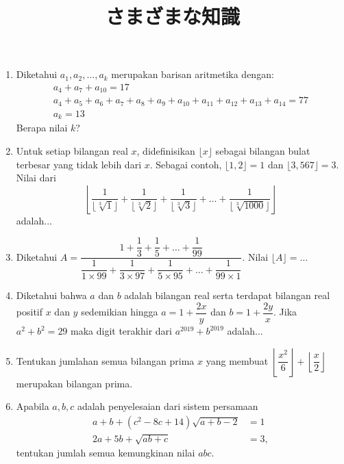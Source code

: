 \documentclass[12pt]{scrartcl}
\title{さまざまな知識}
\begin{document}
\maketitle

\renewcommand*\contentsname{Daftar Isi}
\tableofcontents

\newpage
\begin{enumerate}
    \item Diketahui $a_1, a_2, \dots, a_k$ merupakan barisan aritmetika dengan:
    \begin{align*}
        a_4 + a_7 + a_{10} = 17\\
    a_4 + a_5 + a_6 + a_7 + a_8 + a_9 + a_{10} + a_{11} + a_{12} + a_{13} + a_{14} = 77\\
    a_k = 13
    \end{align*}
    Berapa nilai $k$?

    \item Untuk setiap bilangan real $x$, didefinisikan $\lfloor x \rfloor$ sebagai bilangan bulat terbesar yang tidak lebih dari $x$. Sebagai contoh, $\lfloor 1,2 \rfloor = 1$ dan $\lfloor 3,567 \rfloor = 3$. Nilai dari
    \[ \left\lfloor \dfrac{1}{\lfloor \sqrt[3]{1} \rfloor} + \dfrac{1}{\lfloor \sqrt[3]{2} \rfloor} + \dfrac{1}{\lfloor \sqrt[3]{3} \rfloor} + \dots + \dfrac{1}{\lfloor \sqrt[3]{1000} \rfloor} \right\rfloor \]
    adalah...

    \item Diketahui $A = \dfrac{1+\dfrac{1}{3}+\dfrac{1}{5}+\dots+\dfrac{1}{99}}{\dfrac{1}{1\times99}+\dfrac{1}{3\times97}+\dfrac{1}{5\times95}+\dots+\dfrac{1}{99\times1}}$. Nilai $\lfloor A \rfloor =\dots$
    
    \item Diketahui bahwa $a$ dan $b$ adalah bilangan real serta terdapat bilangan real positif $x$ dan $y$ sedemikian hingga $a=1+\dfrac{2x}{y}$ dan $b=1+\dfrac{2y}{x}$. Jika $a^2+b^2=29$ maka digit terakhir dari $a^{2019}+b^{2019}$ adalah...

    \item Tentukan jumlahan semua bilangan prima $x$ yang membuat $\left\lfloor \dfrac{x^2}{6} \right\rfloor + \left\lfloor \dfrac{x}{2} \right\rfloor$ merupakan bilangan prima.

    \item Apabila $a,b,c$ adalah penyelesaian dari sistem persamaan
    \begin{align*}
        a+b+(c^2-8c+14)\sqrt{a+b-2} &= 1\\
        2a+5b+\sqrt{ab+c} &= 3,
    \end{align*}
    tentukan jumlah semua kemungkinan nilai $abc$.


\end{enumerate}
\end{document}
